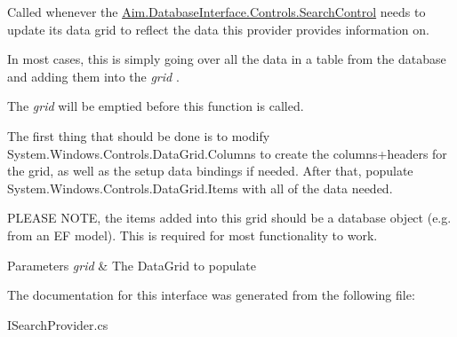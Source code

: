 Called whenever the \mbox{\hyperlink{class_aim_1_1_database_interface_1_1_controls_1_1_search_control}{Aim.\+Database\+Interface.\+Controls.\+Search\+Control}} needs to update it\textquotesingle{}s data grid to reflect the data this provider provides information on. 

In most cases, this is simply going over all the data in a table from the database and adding them into the {\itshape grid} .

The {\itshape grid}  will be emptied before this function is called.

The first thing that should be done is to modify System.\+Windows.\+Controls.\+Data\+Grid.\+Columns to create the columns+headers for the grid, as well as the setup data bindings if needed. After that, populate System.\+Windows.\+Controls.\+Data\+Grid.\+Items with all of the data needed.

P\+L\+E\+A\+SE N\+O\+TE, the items added into this grid should be a database object (e.\+g. from an EF model). This is required for most functionality to work. 


\begin{DoxyParams}{Parameters}
{\em grid} & The Data\+Grid to populate\\
\hline
\end{DoxyParams}


The documentation for this interface was generated from the following file\+:\begin{DoxyCompactItemize}
\item 
I\+Search\+Provider.\+cs\end{DoxyCompactItemize}
